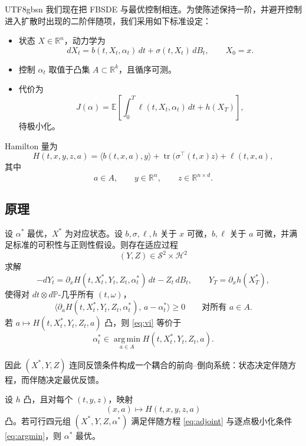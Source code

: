 \documentclass{article}
\theoremstyle{plain}
\theoremstyle{definition}
\theoremstyle{remark}
\numberwithin{equation}{section}
\newcommand{\E}{\mathbb{E}}
\newcommand{\Prob}{\mathbb{P}}
\newcommand{\R}{\mathbb{R}}
\newcommand{\Sc}{\mathcal{S}}
\newcommand{\Hc}{\mathcal{H}}
\begin{document}
\begin{CJK*}{UTF8}{gbsn}
我们现在把 FBSDE 与最优控制相连。为使陈述保持一阶，并避开控制进入扩散时出现的二阶伴随项，我们采用如下标准设定：
\begin{itemize}
  \item 状态 $X\in\R^n$，动力学为
  \[
    dX_t=b(t,X_t,\alpha_t)\,dt+\sigma(t,X_t)\,dB_t,\qquad X_0=x.
  \]
  \item 控制 $\alpha_t$ 取值于凸集 $A\subset\R^k$，且循序可测。
  \item 代价为
  \[
    J(\alpha)=\E\left[\int_0^T \ell(t,X_t,\alpha_t)\,dt+h(X_T)\right],
  \]
  待极小化。
\end{itemize}

\begin{definition}[Hamilton 量]\label{def:hamiltonian}
Hamilton 量为
\[
  H(t,x,y,z,a)=\langle b(t,x,a),y\rangle+\operatorname{tr}\bigl(\sigma^\top(t,x)z\bigr)+\ell(t,x,a),
\]
其中
\[
  a\in A,\qquad y\in\R^n,\qquad z\in\R^{n\times d}.
\]
\end{definition}

\subsection{原理}

\begin{theorem}\label{thm:smp}
设 $\alpha^*$ 最优，$X^*$ 为对应状态。设 $b,\sigma,\ell,h$ 关于 $x$ 可微，$b,\ell$ 关于 $a$ 可微，并满足标准的可积性与正则性假设。则存在适应过程
\[
  (Y,Z)\in\Sc^2\times\Hc^2
\]
求解
\begin{equation}\label{eq:adjoint}
  -dY_t=\partial_x H(t,X_t^*,Y_t,Z_t,\alpha_t^*)\,dt-Z_t\,dB_t,\qquad Y_T=\partial_xh(X_T^*),
\end{equation}
使得对 $dt\otimes d\Prob$-几乎所有 $(t,\omega)$，
\begin{equation}\label{eq:vi}
  \bigl\langle\partial_aH(t,X_t^*,Y_t,Z_t,\alpha_t^*),\,a-\alpha_t^*\bigr\rangle\ge 0\qquad\text{对所有 }a\in A.
\end{equation}
若 $a\mapsto H(t,X_t^*,Y_t,Z_t,a)$ 凸，则 \eqref{eq:vi} 等价于
\begin{equation}\label{eq:argmin}
  \alpha_t^*\in\operatorname*{arg\,min}_{a\in A}H(t,X_t^*,Y_t,Z_t,a).
\end{equation}
\end{theorem}

因此 $(X^*,Y,Z)$ 连同反馈条件构成一个耦合的前向--倒向系统：状态决定伴随方程，而伴随决定最优反馈。

\begin{theorem}\label{thm:sufficient}
设 $h$ 凸，且对每个 $(t,y,z)$，映射
\[
  (x,a)\longmapsto H(t,x,y,z,a)
\]
凸。若可行四元组 $(X^*,Y,Z,\alpha^*)$ 满足伴随方程 \eqref{eq:adjoint} 与逐点极小化条件 \eqref{eq:argmin}，则 $\alpha^*$ 最优。
\end{theorem}


\end{CJK*}
\end{document}
